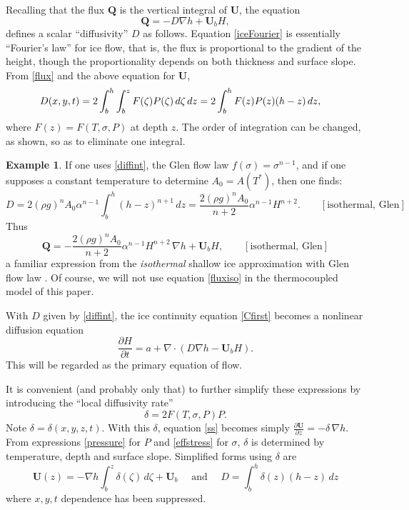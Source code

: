 \documentclass{amsart}%
\theoremstyle{plain}
\theoremstyle{definition}
\newtheorem*{example}{Example}
\theoremstyle{remark}
\newcommand{\ddt}[1]{\ensuremath{\frac{\partial #1}{\partial t}}}
\newcommand{\ddz}[1]{\ensuremath{\frac{\partial #1}{\partial z}}}
\newcommand{\diverg}{\nabla\cdot}
\newcommand{\grad}{\nabla}
\newcommand{\bQ}{{\mathbf{Q}}}
\newcommand{\bU}{{\mathbf{U}}}
\begin{document}
Recalling that the flux $\bQ$ is the vertical integral of $\bU$, the equation
\begin{equation}\label{iceFourier}
\bQ = - D\grad h + \bU_b H,
\end{equation}
defines a scalar ``diffusivity'' $D$ \cite{vanderVeen} as follows.  Equation \eqref{iceFourier} is essentially ``Fourier's law'' for ice flow, that is, the flux is proportional to the gradient of the height, though the proportionality depends on both thickness and surface slope.  From \eqref{flux} and the above equation for $\bU$,
\begin{align}
\label{diffint} D(x,y,t) &= 2 \int_{b}^h \int_{b}^z F(\zeta) P(\zeta)\,d\zeta\,dz = 2 \int_{b}^h F(z)P(z)(h-z)\,dz,\notag
\end{align}
where $F(z)=F(T,\sigma,P)$ at depth $z$.  The order of integration can be changed, as shown, so as to eliminate one integral.

\begin{example} If one uses \eqref{diffint}, the Glen flow law $f(\sigma)=\sigma^{n-1}$, and if one supposes a constant temperature to determine $A_0=A(T^*)$, then one finds:
    $$D=2(\rho g)^n A_0 \alpha^{n-1} \int_{b}^h (h-z)^{n+1}\,dz=\frac{2(\rho g)^n A_0}{n+2} \alpha^{n-1} H^{n+2}. \qquad [\text{isothermal, Glen}]$$
Thus
\begin{equation}\label{fluxiso}
\bQ=-\frac{2(\rho g)^n A_0}{n+2} \alpha^{n-1} H^{n+2} \, \grad h + \bU_b H, \qquad [\text{isothermal, Glen}]\end{equation}
a familiar expression from the \emph{isothermal} shallow ice approximation with Glen flow law \cite{EISMINT96,Paterson}.  Of course, we will not use equation \eqref{fluxiso} in the thermocoupled model of this paper.\end{example}

With $D$ given by \eqref{diffint}, the ice continuity equation \eqref{Cfirst} becomes a nonlinear diffusion equation
\begin{equation}\label{Cdiffform}
\ddt{H} = a + \diverg \left(D \grad h -\bU_b H\right).
\end{equation}
This will be regarded as the primary equation of flow.

It is convenient (and probably only that) to further simplify these expressions by introducing the ``local diffusivity rate''
    $$\delta = 2 F(T,\sigma,P) P.$$
Note $\delta=\delta(x,y,z,t)$.  With this $\delta$, equation \eqref{ss} becomes simply  $\ddz{\bU} = - \delta \, \grad h$.  From expressions \eqref{pressure} for $P$ and \eqref{effstress} for $\sigma$, $\delta$ is determined by temperature, depth and surface slope.  Simplified forms using $\delta$ are
\begin{equation}\label{UDsimp}
  \bU(z) = - \grad h \int_{b}^z \delta(\zeta) \,d\zeta + \bU_b \quad \text{ and } \quad D = \int_{b}^h \delta(z) (h-z) \,dz
\end{equation}
where $x,y,t$ dependence has been suppressed.
\end{document}
